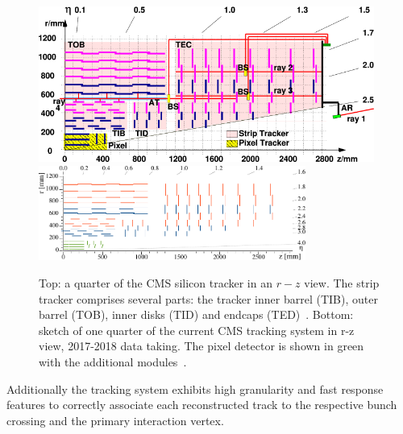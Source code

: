 \begin{figure}[h]
\centering
\includegraphics[width=0.98\textwidth]{Figures/c2/las}\\
\vspace{1cm}
\includegraphics[width=0.78\textwidth]{Figures/c2/Phase1_Tracker_1Quarter.pdf}

\caption{Top: a quarter of the CMS silicon tracker in an $r-z$
  view. The strip tracker comprises several parts: the tracker inner
  barrel (TIB), outer barrel (TOB), inner disks (TID) and endcaps
  (TED)~\cite{Adam:1171503}. Bottom:
sketch of one quarter of the current CMS tracking system in
  r-z view, 2017-2018 data taking. The pixel detector is shown in
  green with the additional modules~\cite{trackingPU}.}
\label{fig:tracker}
\end{figure} 
Additionally the tracking system exhibits high granularity and
fast response features to correctly associate each reconstructed track
to the respective bunch crossing and the primary interaction vertex.

